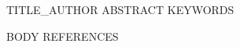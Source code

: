 \documentclass[pdflatex,sn-mathphys-num]{sn-jnl}
\begin{document}
{{TITLE_AUTHOR}}
{{ABSTRACT}}
{{KEYWORDS}}
\maketitle
{{BODY}}
\backmatter
{{REFERENCES}}
\end{document}
